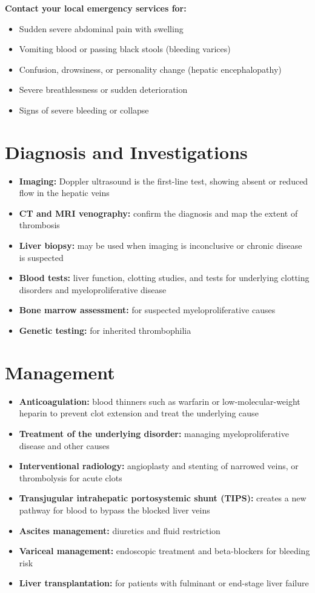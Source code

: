 \textbf{Contact your local emergency services for:}
\begin{itemize}
    \item Sudden severe abdominal pain with swelling
    \item Vomiting blood or passing black stools (bleeding varices)
    \item Confusion, drowsiness, or personality change (hepatic encephalopathy)
    \item Severe breathlessness or sudden deterioration
    \item Signs of severe bleeding or collapse
\end{itemize}

\section*{Diagnosis and Investigations}
\begin{itemize}
    \item \textbf{Imaging:} Doppler ultrasound is the first-line test, showing absent or reduced flow in the hepatic veins
    \item \textbf{CT and MRI venography:} confirm the diagnosis and map the extent of thrombosis
    \item \textbf{Liver biopsy:} may be used when imaging is inconclusive or chronic disease is suspected
    \item \textbf{Blood tests:} liver function, clotting studies, and tests for underlying clotting disorders and myeloproliferative disease
    \item \textbf{Bone marrow assessment:} for suspected myeloproliferative causes
    \item \textbf{Genetic testing:} for inherited thrombophilia
\end{itemize}

\section*{Management}
\begin{itemize}
    \item \textbf{Anticoagulation:} blood thinners such as warfarin or low-molecular-weight heparin to prevent clot extension and treat the underlying cause
    \item \textbf{Treatment of the underlying disorder:} managing myeloproliferative disease and other causes
    \item \textbf{Interventional radiology:} angioplasty and stenting of narrowed veins, or thrombolysis for acute clots
    \item \textbf{Transjugular intrahepatic portosystemic shunt (TIPS):} creates a new pathway for blood to bypass the blocked liver veins
    \item \textbf{Ascites management:} diuretics and fluid restriction
    \item \textbf{Variceal management:} endoscopic treatment and beta-blockers for bleeding risk
    \item \textbf{Liver transplantation:} for patients with fulminant or end-stage liver failure
\end{itemize}

